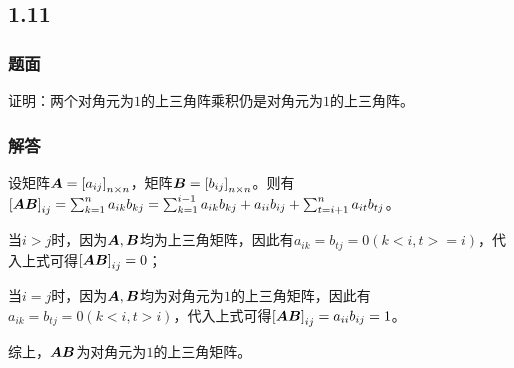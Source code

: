 \documentclass[9pt,xcolor=svgnames]{beamer} %
\begin{document}
\subsection*{1.11}
\begin{frame}
    \frametitle{题面}
    证明：两个对角元为\(1\)的上三角阵乘积仍是对角元为\(1\)的上三角阵。
\end{frame}
\begin{frame}
    \frametitle{解答}
    设矩阵\(\boldsymbol{A}=\left[ a_{ij} \right]_{n\times n}\)，矩阵\(\boldsymbol{B}=\left[ b_{ij} \right]_{n\times n}\)。则有\(\left[ \boldsymbol{A}\boldsymbol{B} \right]_{ij}=\sum_{k=1}^na_{ik}b_{kj}=\sum_{k=1}^{i-1}a_{ik}b_{kj}+a_{ii}b_{ij}+\sum_{t=i+1}^na_{it}b_{tj}\)。

    当\(i>j\)时，因为\(\boldsymbol{A},\boldsymbol{B}\)均为上三角矩阵，因此有\(a_{ik}=b_{tj}=0(k<i,t>=i)\)，代入上式可得\(\left[ \boldsymbol{A}\boldsymbol{B} \right]_{ij}=0\)；

    当\(i=j\)时，因为\(\boldsymbol{A},\boldsymbol{B}\)均为对角元为\(1\)的上三角矩阵，因此有\(a_{ik}=b_{tj}=0(k<i,t>i)\)，代入上式可得\(\left[ \boldsymbol{A}\boldsymbol{B} \right]_{ij}=a_{ii}b_{ij}=1\)。

    综上，\(\boldsymbol{A}\boldsymbol{B}\)为对角元为\(1\)的上三角矩阵。
\end{frame}
\end{document}
